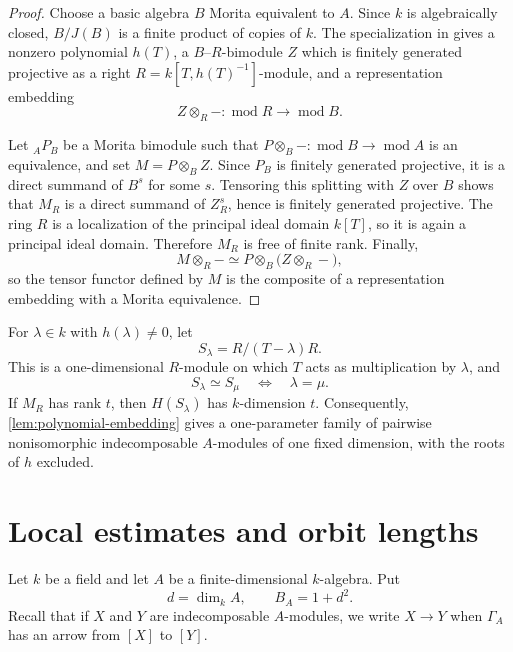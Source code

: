 \documentclass[11pt,letterpaper,reqno]{amsart}
\theoremstyle{definition}
\newcommand{\modcat}{\operatorname{mod}}
\begin{document}
\begin{proof} Choose a basic algebra $B$ Morita equivalent to $A$.  Since $k$ is algebraically closed, $B/J(B)$ is a finite product of copies of $k$. The specialization in \cite[Remark~4.10]{BPS} gives a nonzero polynomial
$h(T)$, a $B$--$R$-bimodule $Z$ which is finitely generated projective as a
right $R=k[T,h(T)^{-1}]$-module, and a representation embedding
\[
Z\otimes_R-:\modcat R\longrightarrow\modcat B.
\]

Let ${}_AP_B$ be a Morita bimodule such that
$P\otimes_B-:\modcat B\to\modcat A$ is an equivalence, and set
$M=P\otimes_BZ$.  Since $P_B$ is finitely generated projective, it is a
direct summand of $B^s$ for some $s$.  Tensoring this splitting with $Z$
over $B$ shows that $M_R$ is a direct summand of $Z_R^s$, hence is finitely
generated projective.  The ring $R$ is a localization of the principal
ideal domain $k[T]$, so it is again a principal ideal domain.  Therefore
$M_R$ is free of finite rank.  Finally,
\[
M\otimes_R-
 \simeq P\otimes_B\bigl(Z\otimes_R-\bigr),
\]
so the tensor functor defined by $M$ is the composite of a representation
embedding with a Morita equivalence.
\end{proof}

For $\lambda\in k$ with $h(\lambda)\neq0$, let
\begin{equation}\label{eq:specialization-module}
S_\lambda=R/(T-\lambda)R.
\end{equation}
This is a one-dimensional $R$-module on which $T$ acts as multiplication by
$\lambda$, and
\[
S_\lambda\simeq S_\mu\quad\Longleftrightarrow\quad\lambda=\mu.
\]
If $M_R$ has rank $t$, then $H(S_\lambda)$ has $k$-dimension $t$.
Consequently, \cref{lem:polynomial-embedding} gives a one-parameter family
of pairwise nonisomorphic indecomposable $A$-modules of one fixed dimension,
with the roots of $h$ excluded.

\section{Local estimates and orbit lengths}\label{sec:local}

Let $k$ be a field and let $A$ be a finite-dimensional $k$-algebra.  Put
\begin{equation*}
d=\dim_kA,
\qquad
B_A=1+d^2.
\end{equation*}
Recall that if $X$ and $Y$ are indecomposable $A$-modules, we write $X\longrightarrow Y$ when
$\Gamma_A$ has an arrow from $[X]$ to $[Y]$.  
\end{document}
